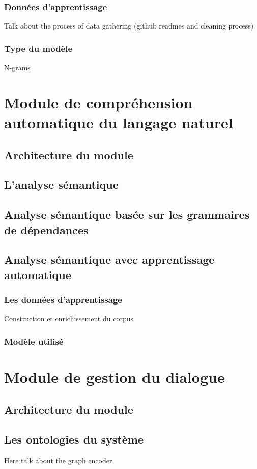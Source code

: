 		\subsubsection*{Données d'apprentissage}
		Talk about the process of data gathering (github readmes and cleaning process)
		\subsubsection*{Type du modèle}
		N-grams

\section{Module de compréhension automatique du langage naturel }
	\subsection{Architecture du module}
	\subsection{L'analyse sémantique}
	\subsection{Analyse sémantique basée sur les grammaires de dépendances}
	\subsection{Analyse sémantique avec apprentissage automatique}
		\subsubsection{Les données d'apprentissage}
		Construction et enrichissement du corpus 
		\subsubsection{Modèle utilisé}
	
	
\section{Module de gestion du dialogue}
	\subsection{Architecture du module}
	\subsection{Les ontologies du système}
		Here talk about the graph encoder 

